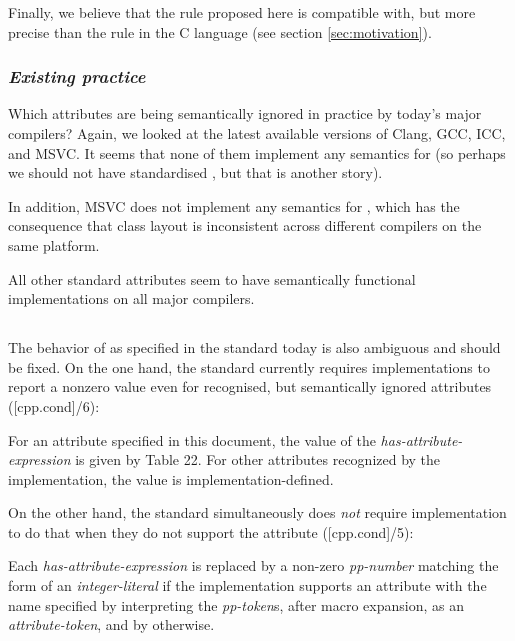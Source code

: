 Finally, we believe that the rule proposed here is compatible with, but more precise than the rule in the C language (see section \ref{sec:motivation}).


\subsubsection*{\emph{Existing practice}}

Which attributes are being semantically ignored in practice by today's major compilers? Again, we looked at the latest available versions of Clang, GCC, ICC, and MSVC. It seems that none of them implement any semantics for  (so perhaps we should not have standardised , but that is another story).

In addition, MSVC does not implement any semantics for , which has the consequence that class layout is inconsistent across different compilers on the same platform.

All other standard attributes seem to have semantically functional implementations on all major compilers.

\subsection{}

The behavior of  as specified in the standard today is also ambiguous and should be fixed. On the one hand, the standard currently requires implementations to report a nonzero
value even for recognised, but semantically ignored attributes ([cpp.cond]/6):

\begin{adjustwidth}{0.5cm}{0.5cm}
For an attribute specified in this document, the value of the \emph{has-attribute-expression} is given by Table 22. For other attributes recognized by the implementation, the value is implementation-defined.
\end{adjustwidth}

On the other hand, the standard simultaneously does \emph{not} require implementation to do that when they do not support the attribute ([cpp.cond]/5):

\begin{adjustwidth}{0.5cm}{0.5cm}
Each \emph{has-attribute-expression} is replaced by a non-zero \emph{pp-number} matching the form of an \emph{integer-literal} if the implementation supports an attribute with the name specified by interpreting the \emph{pp-token}s, after macro expansion, as an \emph{attribute-token}, and by  otherwise.
\end{adjustwidth}


